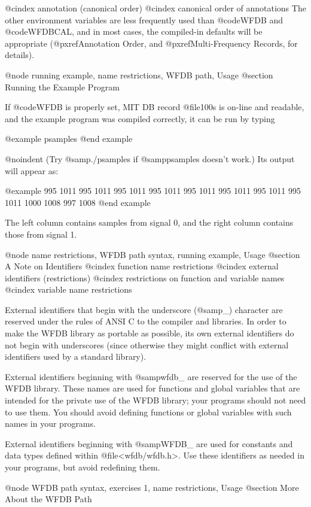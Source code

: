 {@cindex annotation (canonical order)
@cindex canonical order of annotations
The other environment variables are less frequently used than @code{WFDB}
and @code{WFDBCAL}, and in most cases, the compiled-in defaults will be
appropriate (@pxref{Annotation Order}, and @pxref{Multi-Frequency Records},
for details).

@node     running example, name restrictions, WFDB path, Usage
@section Running the Example Program

If @code{WFDB} is properly set, MIT DB record @file{100s} is on-line and
readable, and the example program was compiled correctly, it can be run
by typing

@example
psamples
@end example

@noindent
(Try @samp{./psamples} if @samp{psamples} doesn't work.)  Its output
will appear as:

@example
995     1011
995     1011
995     1011
995     1011
995     1011
995     1011
995     1011
995     1011
1000    1008
997     1008
@end example

The left column contains samples from signal 0, and the right column
contains those from signal 1.

@node     name restrictions, WFDB path syntax, running example, Usage
@section A Note on Identifiers
@cindex function name restrictions
@cindex external identifiers (restrictions)
@cindex restrictions on function and variable names
@cindex variable name restrictions

External identifiers that begin with the underscore (@samp{_}) character
are reserved under the rules of ANSI C to the compiler and libraries.
In order to make the WFDB library as portable as possible, its own external
identifiers do not begin with underscores (since otherwise they might
conflict with external identifiers used by a standard library).

External identifiers beginning with @samp{wfdb_} are reserved for the use
of the WFDB library.  These names are used for functions and global variables
that are intended for the private use of the WFDB library; your programs
should not need to use them.  You should avoid defining functions or
global variables with such names in your programs.

External identifiers beginning with @samp{WFDB_} are used for constants
and data types defined within @file{<wfdb/wfdb.h>}.  Use these identifiers
as needed in your programs, but avoid redefining them.

@node     WFDB path syntax, exercises 1, name restrictions, Usage
@section More About the WFDB Path

}
